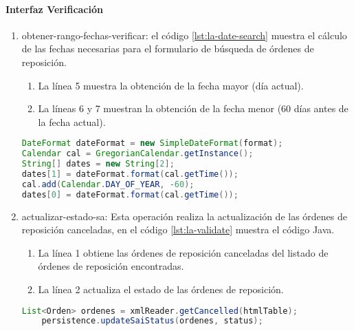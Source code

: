 \paragraph{\indent Interfaz Verificación}
\begin{enumerate}
	\item obtener-rango-fechas-verificar: el código \ref{lst:la-date-search} muestra el cálculo de las fechas necesarias para el formulario de búsqueda de órdenes de reposición.
	\begin{enumerate}
		\item La línea 5 muestra la obtención de la fecha mayor (día actual).
		\item La líneas 6 y 7 muestran la obtención de la fecha menor (60 días antes de la fecha actual).
	\end{enumerate}
	\begin{lstlisting}[language=Java, caption={Cálculo del rango de fechas para buscar órdenes de reposición canceladas.}, label={lst:la-date-search}]
DateFormat dateFormat = new SimpleDateFormat(format);
Calendar cal = GregorianCalendar.getInstance();
String[] dates = new String[2];
dates[1] = dateFormat.format(cal.getTime());
cal.add(Calendar.DAY_OF_YEAR, -60);
dates[0] = dateFormat.format(cal.getTime());
	\end{lstlisting}

	\item actualizar-estado-sa: Esta operación realiza la actualización de las órdenes de reposición canceladas, en el código \ref{lst:la-validate} muestra el código Java.
	\begin{enumerate}
		\item La línea 1 obtiene las órdenes de reposición canceladas del listado de órdenes de reposición encontradas.
		\item La línea 2 actualiza el estado de las órdenes de reposición.
	\end{enumerate}
	\begin{lstlisting}[language=Java, caption={Actualización de órdenes de reposición canceladas.}, label={lst:la-validate}]
	List<Orden> ordenes = xmlReader.getCancelled(htmlTable);
	persistence.updateSaiStatus(ordenes, status);
	\end{lstlisting}
\end{enumerate}


